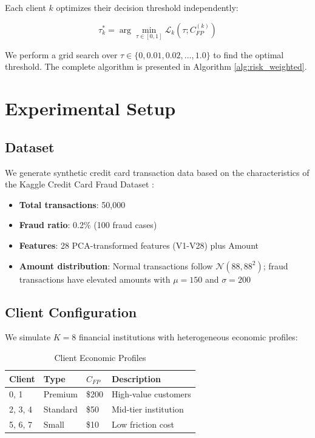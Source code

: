 \documentclass[conference]{IEEEtran}
\begin{document}
Each client $k$ optimizes their decision threshold independently:

\begin{equation}
    \tau_k^* = \arg\min_{\tau \in [0,1]} \mathcal{L}_k(\tau; C_{FP}^{(k)})
    \label{eq:threshold}
\end{equation}

We perform a grid search over $\tau \in \{0, 0.01, 0.02, \ldots, 1.0\}$ to find the optimal threshold. The complete algorithm is presented in Algorithm \ref{alg:risk_weighted}.

\section{Experimental Setup}
\label{sec:experiments}

\subsection{Dataset}

We generate synthetic credit card transaction data based on the characteristics of the Kaggle Credit Card Fraud Dataset \cite{dal2017credit}:

\begin{itemize}
    \item \textbf{Total transactions}: 50,000
    \item \textbf{Fraud ratio}: 0.2\% (100 fraud cases)
    \item \textbf{Features}: 28 PCA-transformed features (V1-V28) plus Amount
    \item \textbf{Amount distribution}: Normal transactions follow $\mathcal{N}(88, 88^2)$; fraud transactions have elevated amounts with $\mu = 150$ and $\sigma = 200$
\end{itemize}

\subsection{Client Configuration}

We simulate $K=8$ financial institutions with heterogeneous economic profiles:

\begin{table}[h]
\centering
\caption{Client Economic Profiles}
\label{tab:client_profiles}
\begin{tabular}{@{}llll@{}}
\toprule
\textbf{Client} & \textbf{Type} & \textbf{$C_{FP}$} & \textbf{Description} \\
\midrule
0, 1 & Premium & \$200 & High-value customers \\
2, 3, 4 & Standard & \$50 & Mid-tier institution \\
5, 6, 7 & Small & \$10 & Low friction cost \\
\bottomrule
\end{tabular}
\end{table}
\end{document}
